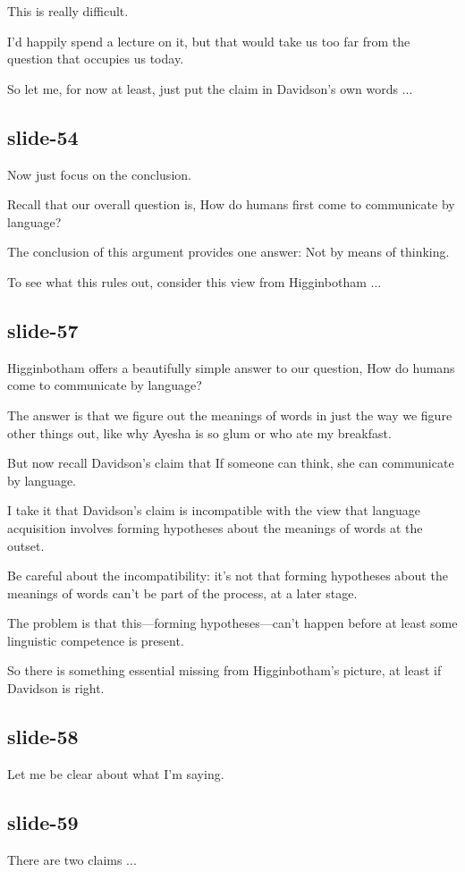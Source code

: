 \documentclass[12pt,\papersize]{extarticle}
\begin{document}
This is really difficult.
 
I'd happily spend a lecture on it, but that would take us too far from the question that occupies us today.
 
So let me, for now at least, just put the claim in Davidson's own words ...
 
\subsection{slide-54}
Now just focus on the conclusion.
 
Recall that our overall question is, How do humans first come to communicate by language?
 
The conclusion of this argument provides one answer: Not by means of thinking.
 
To see what this rules out, consider this view from Higginbotham ...
 
\subsection{slide-57}
Higginbotham offers a beautifully simple answer to our question, How do humans come to communicate by language?
 
The answer is that we figure out the meanings of words in just the way we figure other things out, like why Ayesha is so glum or who ate my breakfast.
 
But now recall Davidson's claim that If someone can think, she can communicate by language.
 
I take it that Davidson's claim is incompatible with the view that language acquisition involves forming hypotheses about the meanings of words at the outset.
 
Be careful about the incompatibility: it's not that forming hypotheses about the meanings of words can't be part of the process, at a later stage.
 
The problem is that this---forming hypotheses---can't happen before at least some linguistic competence is present.
 
So there is something essential missing from Higginbotham's picture, at least if Davidson is right.
 
\subsection{slide-58}
Let me be clear about what I'm saying.
 
\subsection{slide-59}
There are two claims ...
 
\end{document}
